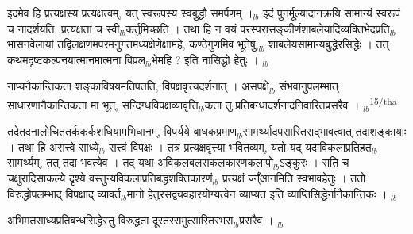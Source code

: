 \documentclass[article,12pt,a4paper]{memoir}%
\newcounter{parCount}
\begin{document}
	  \pstart \leavevmode%
	इदमेव हि प्रत्यक्षस्य प्रत्यक्षत्वम्, यत् स्वरूपस्य स्वबुद्धौ समर्पणम् ।{\tiny $_{lb}$} इदं पुनर्मूल्यादानक्रयि सामान्यं स्वरूपं च नादर्शयति, प्रत्यक्षतां च स्वी{\tiny $_{lb}$}कर्तुमिच्छति । तथा हि न वयं परस्परासङ्कीर्णशाबलेयादिव्यक्तिभेदप्रति{\tiny $_{lb}$}भासनवेलायां तद्विलक्षणमपरमनुगतमध्यक्षेणेक्षामहे, कण्ठेगुणमिव भूतेषु,{\tiny $_{lb}$} शाबलेयसामान्यबुद्धेरसिद्धेः । तत् कथमदृष्टकल्पनयात्मानमात्मना विप्रल{\tiny $_{lb}$}भेमहि ? इति नासिद्धो हेतुः ।
	{}
	\pend%
      {\tiny $_{lb}$}

	  \pstart \leavevmode%
	नाप्यनैकान्तिकता शङ्काविषयमतिपतति, विपक्षवृत्त्यदर्शनात् । असपक्षे{\tiny $_{lb}$} संभवानुपलम्भात् साधारणानैकान्तिकता मा भूत्, सन्दिग्धविपक्षव्यावृत्ति{\tiny $_{lb}$}कता तु प्रतिबन्धादर्शनादनिवारितप्रसरैव ।
	{}
	\pend%
      {\tiny $_{lb}$}\textsuperscript{\textenglish{15/tha}}

	  \pstart \leavevmode%
	तदेतदनालोचिततर्ककर्कशधियामभिधानम्, विपर्यये बाधकप्रमाण{\tiny $_{lb}$}सामर्थ्यादप\leavevmode{}सारितसद्भावत्वात् तदाशङ्कायाः । तथा हि असत्त्वे साध्ये{\tiny $_{lb}$} सत्त्वं विपक्षः । तत्र प्रत्यक्षवृत्त्या भवितव्यम्, यतो यद् यदाविकलाप्रतिहत{\tiny $_{lb}$}सामर्थ्यम्, तत् तदा भवत्येव । तद् यथा अविकलबलसकलकारणकलापो{\tiny $_{lb}$}ऽङ्कुरः । सति च चक्षुरादिसाकल्ये दृश्ये वस्तुन्यविकलाप्रतिबद्धशक्तिकारणं{\tiny $_{lb}$} प्रत्यक्षं ज्न्ँआनमिति स्वभावहेतुः । ततो विरुद्धोपलम्भाद् विपक्षाद् व्यावर्त{\tiny $_{lb}$}मानो हेतुरसद्व्यवहारयोग्यत्वेन व्याप्यत इति व्याप्तिसिद्धेर्नानैकान्तिकः ।
	{}
	\pend%
      {\tiny $_{lb}$}

	  \pstart \leavevmode%
	अभिमतसाध्यप्रतिबन्धसिद्धेस्तु विरुद्धता दूरतरसमुत्सारितरभस{\tiny $_{lb}$}प्रसरैव ।
	{}
	\pend%
      {\tiny $_{lb}$}
\end{document}
